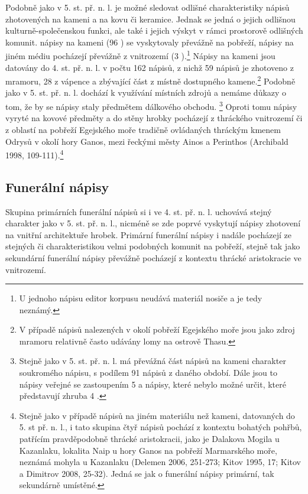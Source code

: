 Podobně jako v 5. st. př. n. l. je možné sledovat odlišné charakteristiky nápisů zhotovených na kameni a na kovu či keramice. Jednak se jedná o jejich odlišnou kulturně-společenskou funkci, ale také i jejich výskyt v rámci prostorově odlišných komunit. nápisy na kameni (96 ) se vyskytovaly převážně na pobřeží, nápisy na jiném médiu pocházejí převážně z vnitrozemí (3 ).\footnote{U jednoho nápisu editor korpusu neudává materiál nosiče a je tedy neznámý.} Nápisy na kameni jsou datovány do 4. st. př. n. l. v počtu 162 nápisů, z nichž 59  nápisů je zhotoveno z mramoru, 28  z vápence a zbývající část z místně dostupného kamene.\footnote{V případě nápisů nalezených v okolí pobřeží Egejského moře jsou jako zdroj mramoru relativně často udávány lomy na ostrově Thasu.} Podobně jako v 5. st. př. n. l. dochází k využívání místních zdrojů a nemáme důkazy o tom, že by se nápisy staly předmětem dálkového obchodu. \footnote{Stejně jako v 5. st. př. n. l. má převážná část nápisů na kameni charakter soukromého nápisu, s podílem 91  nápisů z daného období. Dále jsou to nápisy veřejné se zastoupením 5  a nápisy, které nebylo možné určit, které představují zhruba 4 .} Oproti tomu nápisy vyryté na kovové předměty a do stěny hrobky pocházejí z thráckého vnitrozemí či z oblastí na pobřeží Egejského moře tradičně ovládaných thráckým kmenem Odrysů v okolí hory Ganos, mezi řeckými městy Ainos a Perinthos (Archibald 1998, 109-111).\footnote{Stejně jako v případě nápisů na jiném materiálu než kameni, datovaných do 5. st př. n. l., i tato skupina čtyř nápisů pochází z kontextu bohatých pohřbů, patřícím pravděpodobně thrácké aristokracii, jako je Dalakova Mogila u Kazanlaku, lokalita Naip u hory Ganos na pobřeží Marmarského moře, neznámá mohyla u Kazanlaku (Delemen 2006, 251-273; Kitov 1995, 17; Kitov a Dimitrov 2008, 25-32). Jedná se jak o funerální nápisy primární, tak sekundárně umístěné.}

\subsection[funerální-nápisy-3]{Funerální nápisy}

Skupina primárních funerální nápisů si i ve 4. st. př. n. l. uchovává stejný charakter jako v 5. st. př. n. l., nicméně se zde poprvé vyskytují nápisy zhotovení na vnitřní architektuře hrobek. Primární funerální nápisy i nadále pocházejí ze stejných či charakteristikou velmi podobných komunit na pobřeží, stejně tak jako sekundární funerální nápisy převážně pocházejí z kontextu thrácké aristokracie ve vnitrozemí.

